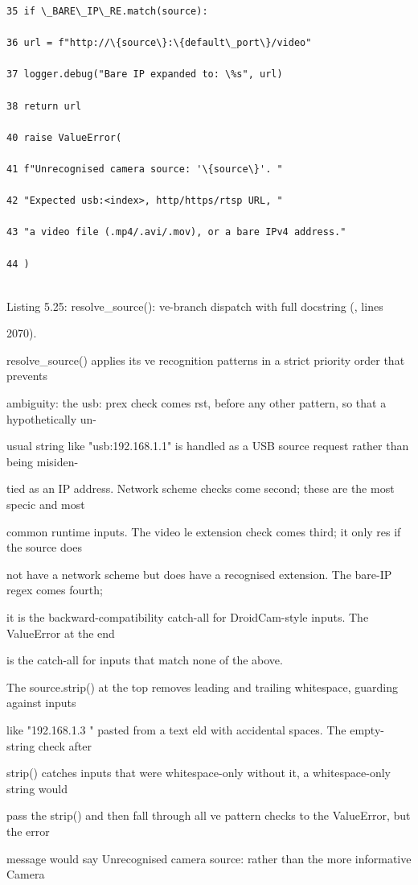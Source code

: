 \begin{listingbox}
\begin{verbatim}
35 if \_BARE\_IP\_RE.match(source):

36 url = f"http://\{source\}:\{default\_port\}/video"

37 logger.debug("Bare IP expanded to: \%s", url)

38 return url

40 raise ValueError(

41 f"Unrecognised camera source: '\{source\}'. "

42 "Expected usb:<index>, http/https/rtsp URL, "

43 "a video file (.mp4/.avi/.mov), or a bare IPv4 address."

44 )


\end{verbatim}
\end{listingbox}
Listing 5.25: resolve\_source(): ve-branch dispatch with full docstring (, lines

2070).

resolve\_source() applies its ve recognition patterns in a strict priority order that prevents

ambiguity: the usb: prex check comes rst, before any other pattern, so that a hypothetically un-

usual string like "usb:192.168.1.1" is handled as a USB source request rather than being misiden-

tied as an IP address. Network scheme checks come second; these are the most specic and most

common runtime inputs. The video le extension check comes third; it only res if the source does

not have a network scheme but does have a recognised extension. The bare-IP regex comes fourth;

it is the backward-compatibility catch-all for DroidCam-style inputs. The ValueError at the end

is the catch-all for inputs that match none of the above.

The source.strip() at the top removes leading and trailing whitespace, guarding against inputs

like "192.168.1.3 " pasted from a text eld with accidental spaces. The empty-string check after

strip() catches inputs that were whitespace-only  without it, a whitespace-only string would

pass the strip() and then fall through all ve pattern checks to the ValueError, but the error

message would say Unrecognised camera source:   rather than the more informative Camera

